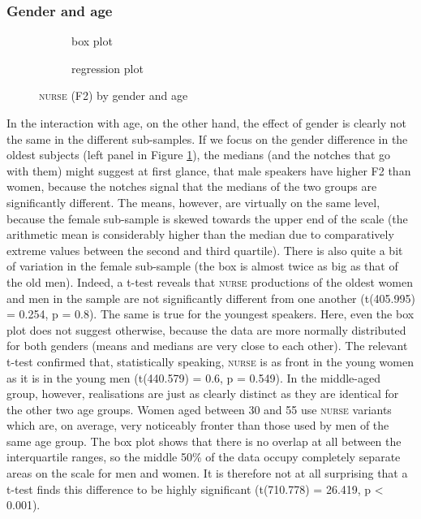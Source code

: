 \subsubsection{Gender and age}
\label{sec.prod.res.vow.nurse.f2.genderage}

\begin{figure}[h!]
	\centering
	\begin{subfigure}{.49\textwidth}
		\centering
			\resizebox{\linewidth}{!}{} 
		\caption{box plot}
		\label{fig.box.f2w.nurse.genderage}
	\end{subfigure}
	\begin{subfigure}{.49\textwidth}
		\centering
			\resizebox{\linewidth}{!}{} 
		\caption{regression plot}
		\label{fig.scatter.f2w.nurse.genderage}
	\end{subfigure}
	\caption{\textsc{nurse} (F2) by gender and age}
\end{figure}

In the interaction with age, on the other hand, the effect of gender is clearly not the same in the different sub-samples.
If we focus on the gender difference in the oldest subjects (left panel in Figure \ref{fig.box.f2w.nurse.genderage}), the medians (and the notches that go with them) might suggest at first glance, that male speakers have higher F2 than women, because the notches signal that the medians of the two groups are significantly different.
The means, however, are virtually on the same level, because the female sub-sample is skewed towards the upper end of the scale (the arithmetic mean is considerably higher than the median due to comparatively extreme values between the second and third quartile).
There is also quite a bit of variation in the female sub-sample (the box is almost twice as big as that of the old men).
Indeed, a t-test reveals that \textsc{nurse} productions of the oldest women and men in the sample are not significantly different from one another (t(405.995) = 0.254, p = 0.8).
The same is true for the youngest speakers.
Here, even the box plot does not suggest otherwise, because the data are more normally distributed for both genders (means and medians are very close to each other).
The relevant t-test confirmed that, statistically speaking, \textsc{nurse} is as front in the young women as it is in the young men (t(440.579) = 0.6, p = 0.549).
In the middle-aged group, however, realisations are just as clearly distinct as they are identical for the other two age groups.
Women aged between 30 and 55 use \textsc{nurse} variants which are, on average, very noticeably fronter than those used by men of the same age group.
The box plot shows that there is no overlap at all between the interquartile ranges, so the middle 50\% of the data occupy completely separate areas on the scale for men and women.
It is therefore not at all surprising that a t-test finds this difference to be highly significant (t(710.778) = 26.419, p < 0.001).

